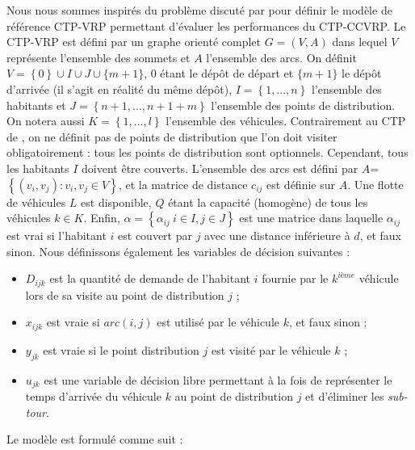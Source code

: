 \documentclass[5p,authoryear]{elsarticle}
\begin{document}
Nous nous sommes inspirés du problème discuté par \cite{naji-azimi_covering_2012} pour définir le modèle de référence CTP-VRP permettant d'évaluer les performances du CTP-CCVRP. Le CTP-VRP est défini par un graphe orienté complet $G=(V,A)$ dans lequel $V$ représente l'ensemble des sommets et $A$ l'ensemble des arcs. On définit $V=\left\{0\right\} \cup I \cup J \cup \{m+1\}$,  $0$ étant le dépôt de départ et $\{m+1\}$ le dépôt d'arrivée (il s'agit en réalité du même dépôt), $I= \left\{1,...,n\right\}$ l'ensemble des habitants et $J= \left\{n+1,...,n+1+m\right\}$  l'ensemble des points de distribution. On notera aussi $K= \left\{1,...,l\right\}$ l'ensemble des véhicules. Contrairement au CTP de \cite{gendreau_covering_1997}, on ne définit pas de points de distribution que l'on doit visiter obligatoirement : tous les points de distribution sont optionnels. Cependant, tous les habitants $I$ doivent être couverts. L'ensemble des arcs est défini par $A$= $\left\{(v_i,v_j):v_i,v_j\in V\right\}$, et la matrice de distance $c_{ij}$ est définie sur $A$. Une flotte de véhicules $L$ est disponible, $Q$ étant la capacité (homogène) de tous les véhicules $k \in K$. Enfin, $\alpha = \left\{\alpha_{ij} \ i \in I, j \in J\right\}$ est une matrice dans laquelle $\alpha_{ij}$ est vrai si l'habitant $i$ est couvert par $j$ avec une distance inférieure à $d$, et faux sinon. Nous définissons également les variables de décision suivantes :
\begin{itemize}
 \item $D_{ijk}$ est la quantité de demande de l'habitant $i$ fournie par le $k^{ième}$ véhicule lors de sa visite au point de distribution $j$ ;
 \item $x_{ijk}$ est vraie si $arc(i,j)$ est utilisé par le véhicule $k$, et faux sinon ;
 \item $y_{jk}$ est vraie si le point distribution $j$ est visité par le véhicule $k$ ;
 \item $u_{jk}$ est une variable de décision libre permettant à la fois de représenter le temps d'arrivée du véhicule $k$ au point de distribution $j$ et  d'éliminer les \emph{sub-tour}.
 \end{itemize}

Le modèle est formulé comme suit :
\end{document}
